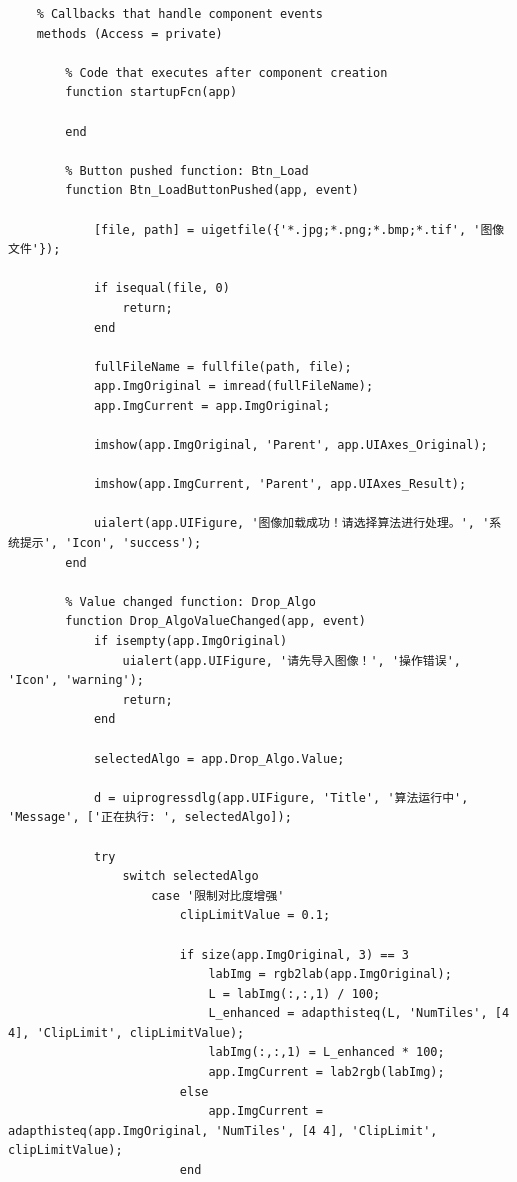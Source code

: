 \documentclass[UTF8, a4paper, 11pt]{ctexart}
\begin{document}
\begin{lstlisting}
    % Callbacks that handle component events
    methods (Access = private)

        % Code that executes after component creation
        function startupFcn(app)
            
        end

        % Button pushed function: Btn_Load
        function Btn_LoadButtonPushed(app, event)
           
            [file, path] = uigetfile({'*.jpg;*.png;*.bmp;*.tif', '图像文件'});
            
            if isequal(file, 0)
                return;
            end
            
            fullFileName = fullfile(path, file);
            app.ImgOriginal = imread(fullFileName); 
            app.ImgCurrent = app.ImgOriginal;       
            
            imshow(app.ImgOriginal, 'Parent', app.UIAxes_Original);
            
            imshow(app.ImgCurrent, 'Parent', app.UIAxes_Result);
            
            uialert(app.UIFigure, '图像加载成功！请选择算法进行处理。', '系统提示', 'Icon', 'success');
        end

        % Value changed function: Drop_Algo
        function Drop_AlgoValueChanged(app, event)
            if isempty(app.ImgOriginal)
                uialert(app.UIFigure, '请先导入图像！', '操作错误', 'Icon', 'warning');
                return;
            end
            
            selectedAlgo = app.Drop_Algo.Value;
            
            d = uiprogressdlg(app.UIFigure, 'Title', '算法运行中', 'Message', ['正在执行: ', selectedAlgo]);
            
            try
                switch selectedAlgo
                    case '限制对比度增强'
                        clipLimitValue = 0.1; 
                        
                        if size(app.ImgOriginal, 3) == 3
                            labImg = rgb2lab(app.ImgOriginal);
                            L = labImg(:,:,1) / 100;
                            L_enhanced = adapthisteq(L, 'NumTiles', [4 4], 'ClipLimit', clipLimitValue);
                            labImg(:,:,1) = L_enhanced * 100;
                            app.ImgCurrent = lab2rgb(labImg);
                        else
                            app.ImgCurrent = adapthisteq(app.ImgOriginal, 'NumTiles', [4 4], 'ClipLimit', clipLimitValue);
                        end
                        

\end{lstlisting}
\end{document}
